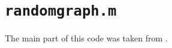 \section{\texttt{randomgraph.m}}
\label{sec:randomnetwork}

The main part of this code was taken from \cite{BruggerSchwirzer2011}.
